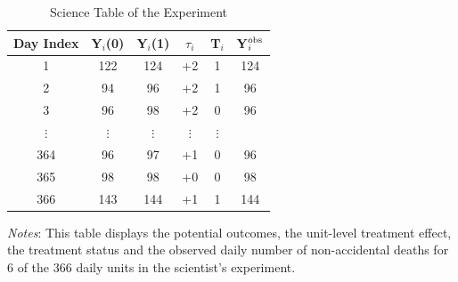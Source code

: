 \begin{table}[!ht]
    \caption{Science Table of the Experiment}
    \label{tab:science_table}
    \centering
            \begin{threeparttable}
                \begin{tabular}{cccccc}
                    \toprule
                    Day Index & Y$_{i}$(0) & Y$_{i}$(1) & $\tau_{i}$ & T$_{i}$ & Y$_{i}^{\textnormal{obs}}$\\ \midrule
                    1         & 122  & 124  & +2 & 1 & 124\\
                    2       & 94  & 96  & +2 & 1 & 96\\
                    3         & 96   & 98 & +2 & 0 & 96  \\
                    $\vdots$          & $\vdots$     &  $\vdots$  &   $\vdots$ &  $\vdots$ \\
                    364      & 96  & 97 & +1 & 0 & 96 \\
                    365      & 98   & 98 & +0 & 0 & 98 \\
                    366      & 143  & 144 & +1 & 1 & 144    \\ \bottomrule
                \end{tabular}
                \begin{tablenotes}
                    \footnotesize
                    \item \textit{Notes}: This table displays the potential outcomes, the unit-level treatment effect, the treatment status and the observed daily number of non-accidental deaths for 6 of the 366 daily units in the scientist's experiment.
                \end{tablenotes}
            \end{threeparttable}
\end{table}